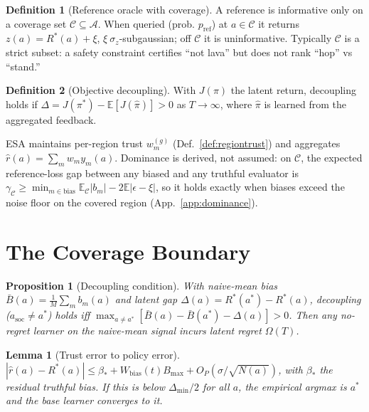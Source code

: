 \documentclass[11pt]{article}
\newtheorem{proposition}{Proposition}
\newtheorem{lemma}{Lemma}
\theoremstyle{definition}\newtheorem{definition}{Definition}
\theoremstyle{definition}\newtheorem{assumption}{Assumption}
\newcommand{\Rstar}{R^{\ast}}\newcommand{\astar}{a^{\ast}}
\newcommand{\asoc}{a_{\mathrm{soc}}}\newcommand{\A}{\mathcal{A}}
\newcommand{\Cov}{\mathcal{C}}\newcommand{\E}{\mathbb{E}}
\begin{document}
\begin{definition}[Reference oracle with coverage]\label{def:reference}
A reference is informative only on a coverage set $\Cov\subseteq\A$. When queried (prob.
$p_{\mathrm{ref}}$) at $a\in\Cov$ it returns $z(a)=\Rstar(a)+\xi$, $\xi\ \sigma_z$-subgaussian; off
$\Cov$ it is uninformative. Typically $\Cov$ is a strict subset: a safety constraint certifies
``not lava'' but does not rank ``hop'' vs ``stand.''
\end{definition}

\begin{definition}[Objective decoupling]\label{def:decoupling}
With $J(\pi)$ the latent return, decoupling holds if $\Delta=J(\pi^\ast)-\E[J(\hat\pi)]>0$ as
$T\to\infty$, where $\hat\pi$ is learned from the aggregated feedback.
\end{definition}

ESA maintains per-region trust $w_m^{(g)}$ (Def.~\ref{def:regiontrust}) and aggregates
$\hat r(a)=\sum_m w_m y_m(a)$. Dominance is derived, not assumed: on $\Cov$, the expected
reference-loss gap between any biased and any truthful evaluator is
$\gamma_\Cov \ge \min_{m\in\text{bias}}\E_\Cov|b_m| - 2\E|\epsilon-\xi|$, so it holds exactly when
biases exceed the noise floor on the covered region (App.~\ref{app:dominance}).

\section{The Coverage Boundary}\label{sec:theory}
\begin{proposition}[Decoupling condition]\label{prop:decoupling}
With naive-mean bias $\bar B(a)=\frac1M\sum_m b_m(a)$ and latent gap $\Delta(a)=\Rstar(\astar)-\Rstar(a)$,
decoupling ($\asoc\neq\astar$) holds iff $\max_{a\neq\astar}[\bar B(a)-\bar B(\astar)-\Delta(a)]>0$.
Then any no-regret learner on the naive-mean signal incurs latent regret $\Omega(T)$.
\end{proposition}

\begin{lemma}[Trust error to policy error]\label{lem:bridge}
$|\hat r(a)-\Rstar(a)|\le \beta_\ast + W_{\mathrm{bias}}(t)B_{\max} + O_P(\sigma/\sqrt{N(a)})$,
with $\beta_\ast$ the residual truthful bias. If this is below $\Delta_{\min}/2$ for all $a$, the
empirical argmax is $\astar$ and the base learner converges to it.
\end{lemma}
\end{document}
